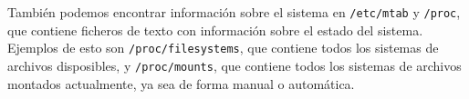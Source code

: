 También podemos encontrar información sobre el sistema en \texttt{/etc/mtab} y \texttt{/proc}, que contiene ficheros de texto con información sobre el estado del sistema.
Ejemplos de esto son \texttt{/proc/filesystems}, que contiene todos los sistemas de archivos disposibles, y \texttt{/proc/mounts}, que contiene todos los sistemas de archivos montados actualmente, ya sea de forma manual o automática.

